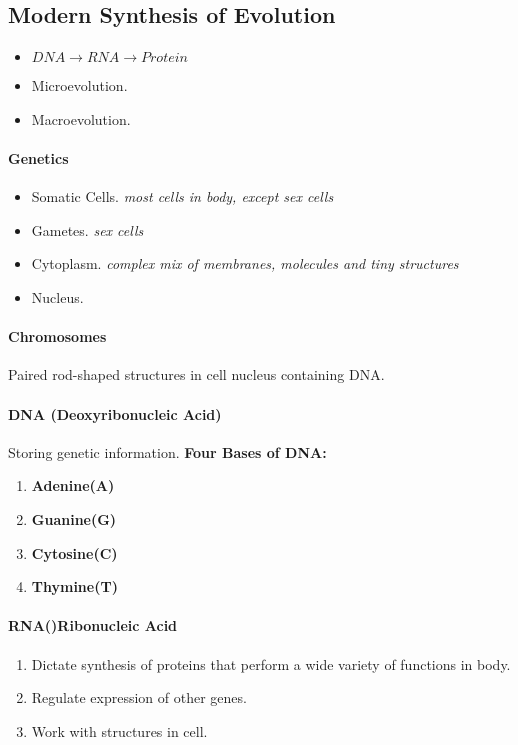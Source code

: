 \documentclass{article}
\begin{document}
	\subsection{Modern Synthesis of Evolution}
	\begin{itemize}
		\item $DNA \rightarrow RNA \rightarrow Protein$
		\item Microevolution.
		\item Macroevolution.
	\end{itemize}
	\paragraph{Genetics}
	\begin{itemize}
		\item Somatic Cells. \emph{most cells in body, except sex cells}
		\item Gametes. \emph{sex cells}
		\item Cytoplasm. \emph{complex mix of membranes, molecules and tiny structures}
		\item Nucleus.
	\end{itemize}
	\paragraph{Chromosomes} Paired rod-shaped structures in cell nucleus containing DNA.
	\paragraph{DNA (Deoxyribonucleic Acid)} Storing genetic information.
	\newline \textbf{Four Bases of DNA:}
	\begin{enumerate}
		\item \textbf{Adenine(A)}
		\item \textbf{Guanine(G)}
		\item \textbf{Cytosine(C)}
		\item \textbf{Thymine(T)}
	\end{enumerate}
	\paragraph{RNA()Ribonucleic Acid}
	\begin{enumerate}
		\item Dictate synthesis of proteins that perform a wide variety of functions in body.
		\item Regulate expression of other genes.
		\item Work with structures in cell.
	\end{enumerate}
\end{document}
